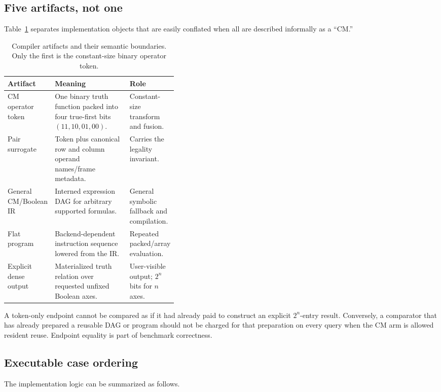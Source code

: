 \documentclass[10pt]{article}
\theoremstyle{plain}
\theoremstyle{definition}
\theoremstyle{remark}
\begin{document}
\subsection{Five artifacts, not one}

Table~\ref{tab:artifacts} separates implementation objects that are easily conflated when all are described informally as a ``CM.''

\begin{table}[t]
\centering
\small
\begin{tabularx}{\linewidth}{@{}p{0.18\linewidth}X p{0.21\linewidth}@{}}
\toprule
\textbf{Artifact} & \textbf{Meaning} & \textbf{Role}\\
\midrule
CM operator token & One binary truth function packed into four true-first bits $(11,10,01,00)$. & Constant-size transform and fusion.\\
Pair surrogate & Token plus canonical row and column operand names/frame metadata. & Carries the legality invariant.\\
General CM/Boolean IR & Interned expression DAG for arbitrary supported formulas. & General symbolic fallback and compilation.\\
Flat program & Backend-dependent instruction sequence lowered from the IR. & Repeated packed/array evaluation.\\
Explicit dense output & Materialized truth relation over requested unfixed Boolean axes. & User-visible output; $2^n$ bits for $n$ axes.\\
\bottomrule
\end{tabularx}
\caption{Compiler artifacts and their semantic boundaries. Only the first is the constant-size binary operator token.}
\label{tab:artifacts}
\end{table}

A token-only endpoint cannot be compared as if it had already paid to construct an explicit $2^n$-entry result. Conversely, a comparator that has already prepared a reusable DAG or program should not be charged for that preparation on every query when the CM arm is allowed resident reuse. Endpoint equality is part of benchmark correctness.

\subsection{Executable case ordering}

The implementation logic can be summarized as follows.
\end{document}
